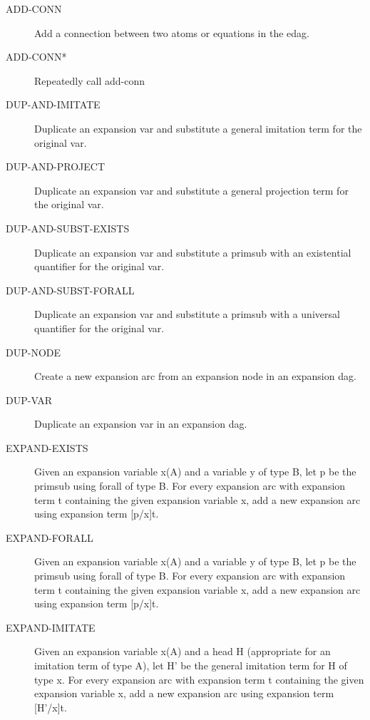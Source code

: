 \begin{description} 
\item[ADD-CONN]  
Add a connection between two atoms or equations in the edag.

\item[ADD-CONN*]  
Repeatedly call add-conn

\item[DUP-AND-IMITATE]  
Duplicate an expansion var and substitute a general imitation term for the original var.

\item[DUP-AND-PROJECT]  
Duplicate an expansion var and substitute a general projection term for the original var.

\item[DUP-AND-SUBST-EXISTS]  
Duplicate an expansion var and substitute a primsub with an existential quantifier for the original var.

\item[DUP-AND-SUBST-FORALL]  
Duplicate an expansion var and substitute a primsub with a universal quantifier for the original var.

\item[DUP-NODE]  
Create a new expansion arc from an expansion node in an expansion dag.

\item[DUP-VAR]  
Duplicate an expansion var in an expansion dag.

\item[EXPAND-EXISTS]  
Given an expansion variable x(A) and a variable y of type B,
let p be the primsub using forall of type B.  For every expansion arc
with expansion term t containing the given expansion variable x, add a
new expansion arc using expansion term [p/x]t.

\item[EXPAND-FORALL]  
Given an expansion variable x(A) and a variable y of type B,
let p be the primsub using forall of type B.  For every expansion arc
with expansion term t containing the given expansion variable x, add a
new expansion arc using expansion term [p/x]t.

\item[EXPAND-IMITATE]  
Given an expansion variable x(A) and a head H (appropriate
for an imitation term of type A), let H' be the general imitation term
for H of type x.  For every expansion arc with expansion term t
containing the given expansion variable x, add a new expansion arc
using expansion term [H'/x]t.


\end{description}
